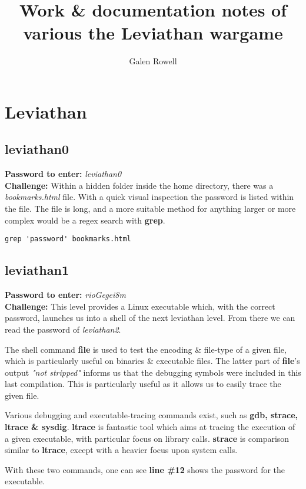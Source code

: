 \documentclass[a4paper]{article}
\newcommand{\pass}[1]{\textbf{Password to enter:} \textit{#1}\\}
\newcommand{\chall}{\textbf{Challenge:} }
\begin{document}
\title{Work \& documentation notes of various the Leviathan wargame}
\author{Galen Rowell}
\maketitle


\section*{Leviathan}

\subsection*{leviathan0}
\pass{leviathan0}
\chall Within a hidden folder inside the home directory, there was a \textit{bookmarks.html} file. With a quick visual inspection the password is listed within the file. The file is long, and a more suitable method for anything larger or more complex would be a regex search with \textbf{grep}.
\begin{lstlisting}
grep 'password' bookmarks.html
\end{lstlisting}

\subsection*{leviathan1}
\pass{rioGegei8m}
\chall This level provides a Linux executable which, with the correct password, launches us into a shell of the next leviathan level. From there we can read the password of \textit{leviathan2}.

The shell command \textbf{file} is used to test the encoding \& file-type of a given file, which is particularly useful on binaries \& executable files. The latter part of \textbf{file}'s output \textit{"not stripped"} informs us that the debugging symbols were included in this last compilation. This is particularly useful as it allows us to easily trace the given file.

Various debugging and executable-tracing commands exist, such as \textbf{gdb, strace, ltrace \& sysdig}. \textbf{ltrace} is fantastic tool which aims at tracing the execution of a given executable, with particular focus on library calls. \textbf{strace} is comparison similar to \textbf{ltrace}, except with a heavier focus upon system calls.

With these two commands, one can see \textbf{line \#12} shows the password for the executable.
\end{document}
